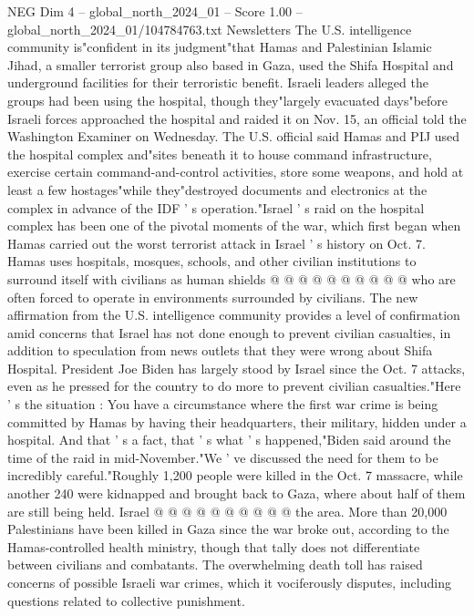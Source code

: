 \begin{textsample}{NEG Dim 4 – global\_north\_2024\_01 – Score 1.00 – global\_north\_2024\_01/104784763.txt}  \label{ex:f4_neg_130}
Newsletters The U.S. intelligence community is"confident in its judgment"that Hamas and Palestinian Islamic Jihad, a smaller terrorist group also based in Gaza, used the Shifa Hospital and underground facilities for their terroristic benefit.
Israeli leaders alleged the groups had been using the hospital, though they"largely evacuated days"before Israeli forces approached the hospital and raided it on Nov. 15, an official told the Washington Examiner on Wednesday.
The U.S. official said Hamas and PIJ used the hospital complex and"sites beneath it to house command infrastructure, exercise certain command-and-control activities, store some weapons, and hold at least a few hostages"while they"destroyed documents and electronics at the complex in advance of the IDF ' s operation."Israel ' s raid on the hospital complex has been one of the pivotal moments of the war, which first began when Hamas carried out the worst terrorist attack in Israel ' s history on Oct. 7.
Hamas uses hospitals, mosques, schools, and other civilian institutions to surround itself with civilians as human shields @ @ @ @ @ @ @ @ @ @ who are often forced to operate in environments surrounded by civilians.
The new affirmation from the U.S. intelligence community provides a level of confirmation amid concerns that Israel has not done enough to prevent civilian casualties, in addition to speculation from news outlets that they were wrong about Shifa Hospital.
President Joe Biden has largely stood by Israel since the Oct. 7 attacks, even as he pressed for the country to do more to prevent civilian casualties."Here ' s the situation : You have a circumstance where the first war crime is being committed by Hamas by having their headquarters, their military, hidden under a hospital.
And that ' s a fact, that ' s what ' s happened,"Biden said around the time of the raid in mid-November."We ' ve discussed the need for them to be incredibly careful."Roughly 1,200 people were killed in the Oct. 7 massacre, while another 240 were kidnapped and brought back to Gaza, where about half of them are still being held.
Israel @ @ @ @ @ @ @ @ @ @ the area.
More than 20,000 Palestinians have been killed in Gaza since the war broke out, according to the Hamas-controlled health ministry, though that tally does not differentiate between civilians and combatants.
The overwhelming death toll has raised concerns of possible Israeli war crimes, which it vociferously disputes, including questions related to collective punishment.

\end{textsample}
